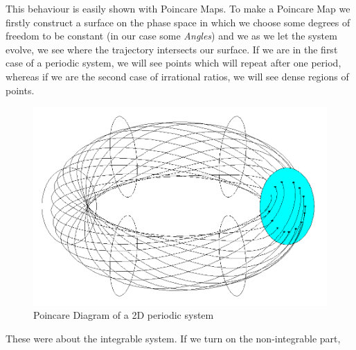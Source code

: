 	This behaviour is easily shown with Poincare Maps. To make a Poincare Map we firstly construct a surface on the phase space in which we choose some degrees of freedom to be constant (in our case some \textit{Angles}) and we as we let the system evolve, we see where the trajectory intersects our surface. If we are in the first case of a periodic system, we will see points which will repeat after one period, whereas if we are the second case of irrational ratios, we will see dense regions of points.  
		\begin{figure}[h!]
			\centering 
			\includegraphics[scale=0.3]{Theory/poin.png}
			\caption{Poincare Diagram of a 2D periodic system}
			\label{fig1}
		\end{figure}
		
	These were about the integrable system. If we turn on the non-integrable part,